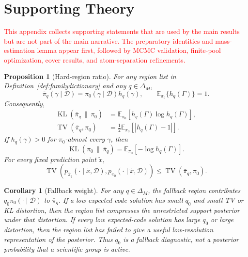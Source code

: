 \documentclass[twoside,11pt]{article}
\newtheorem{proposition}{Proposition}
\newtheorem{corollary}{Corollary}
\newcommand{\D}{\mathcal{D}}
\newcommand{\E}{\mathbb{E}}
\newcommand{\TV}{\operatorname{TV}}
\newcommand{\KL}{\operatorname{KL}}
\newcommand{\rev}[1]{\textcolor{red}{#1}}
\newif\ifBMAincludeSupplement
\begin{document}
\ifBMAincludeSupplement
\appendix

\section{Supporting Theory}
\label{app:supportingtheory}

\rev{This appendix collects supporting statements that are used by the main results but are not part of the main narrative. The preparatory identities and mass-estimation lemma appear first, followed by MCMC validation, finite-pool optimization, cover results, and atom-separation refinements.}

\begin{proposition}[Hard-region ratio]
\label{prop:mixtureidentity}
For any region list in Definition~\ref{def:familydictionary} and any \(q\in\Delta_M\),
\[
\bar\pi_q(\gamma\mid\D)=\pi_0(\gamma\mid\D)h_q(\gamma), \qquad \E_{\pi_0}\{h_q(\Gamma)\}=1.
\]
Consequently,
\begin{align}
\KL\!\left(\bar\pi_q\,\|\,\pi_0\right)&=\E_{\pi_0}\!\left[h_q(\Gamma)\log h_q(\Gamma)\right], \label{eq:mixtureRKL}\\
\TV\!\left(\bar\pi_q,\pi_0\right)&=\frac12\E_{\pi_0}\!\left[|h_q(\Gamma)-1|\right]. \label{eq:mixtureTV}
\end{align}
If $h_q(\gamma)>0$ for $\pi_0$-almost every $\gamma$, then
\begin{equation}
\KL\!\left(\pi_0\,\|\,\bar\pi_q\right) = \E_{\pi_0}\!\left[-\log h_q(\Gamma)\right]. \label{eq:mixtureFKL}
\end{equation}
For every fixed prediction point $\tilde x$,
\[
\TV\!\left(p_{\bar\pi_q}(\cdot\mid\tilde x,\D),p_{\pi_0}(\cdot\mid\tilde x,\D)\right) \le \TV\!\left(\bar\pi_q,\pi_0\right).
\]
\end{proposition}

\begin{corollary}[Fallback weight]
\label{cor:safetyresidue}
For any \(q\in\Delta_M\), the fallback region contributes \(q_0\pi_0(\cdot\mid\D)\) to \(\bar\pi_q\). If a low expected-code solution has small \(q_0\) and small TV or KL distortion, then the region list compresses the unrestricted support posterior under that distortion. If every low expected-code solution has large \(q_0\) or large distortion, then the region list has failed to give a useful low-resolution representation of the posterior. Thus \(q_0\) is a fallback diagnostic, not a posterior probability that a scientific group is active.
\end{corollary}
\end{document}
